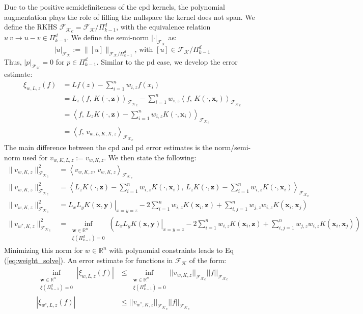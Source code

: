 \documentclass[11pt]{article}
\begin{document}
Due to the positive semidefiniteness of the cpd kernels, the polynomial augmentation plays the role of filling the nullspace the kernel does not span. We define the RKHS $\mathcal{F_K}_c = \mathcal{F_K} / \Pi_{k-1}^d$, with the equivalence relation $u ~ v \rightarrow u-v \in \Pi_{k-1}^d$. We define the semi-norm $| \cdot |_{\mathcal{F_K}}$ as:
\begin{equation}
	\left | u \right |_{\mathcal{F_K}} := \| [u] \|_{\mathcal{F_K} / \Pi_{k-1}^d} \text{, with } [u] \in \mathcal{F_K} / \Pi_{k-1}^d
\end{equation}
Thus, $| p |_{\mathcal{F_K}} = 0$ for $p \in \Pi_{k-1}^d$. Similar to the pd case, we develop the error estimate:
\begin{align*}
	\xi_{w,L,z}(f) &= Lf(z) - \sum_{i=1}^n w_{i,z} f(x_i)\\
	&= L_z \left \langle f, \, K(\cdot, \bm{z}) \right \rangle_{\mathcal{F_K}_c} - \sum_{i=1}^n w_{i,z} \left \langle f, \, K(\cdot, \bm{x}_i) \right \rangle_{\mathcal{F_K}_c}\\
	&= \left \langle f, \, L_z K(\cdot, \bm{z}) - \sum_{i=1}^n w_{i,z} K(\cdot, \bm{x}_i) \right \rangle_{\mathcal{F_K}_c}\\
	&= \left \langle f, \, v_{w,L,K,X,z} \right \rangle_{\mathcal{F_K}_c}
\end{align*}
The main difference between the cpd and pd error estimates is the norm/semi-norm used for $v_{w,K,L,z} := v_{w,K,z}$. We then state the following:
\begin{align*}
	\| v_{w,K,z} \|_{\mathcal{F_K}_c}^2 &= \left \langle v_{w,K,z}, \, v_{w,K,z} \right \rangle_{\mathcal{F_K}_c}\\
	\| v_{w,K,z} \|_{\mathcal{F_K}_c}^2 &= \left \langle L_z K(\cdot, \bm{z}) - \sum_{i=1}^n w_{i,z} K(\cdot, \bm{x}_i), \, L_z K(\cdot, \bm{z}) - \sum_{i=1}^n w_{i,z} K(\cdot, \bm{x}_i) \right \rangle_{\mathcal{F_K}_c}\\
	\| v_{w,K,z} \|_{\mathcal{F_K}_c}^2 &= \left. L_x L_y K(\bm{x}, \bm{y}) \right|_{x=y=z} - 2 \sum_{i=1}^n w_{i,z} K(\bm{x}_i, \bm{z}) + \sum_{i,j=1}^n w_{j,z} w_{i,z} K(\bm{x}_i, \bm{x}_j)\\
	\| v_{w^*,K,z} \|_{\mathcal{F_K}_c}^2 &= \inf_{\substack{\bm{w}\in \mathbb{R}^n \\ \xi (\Pi_{k-1}^d) = 0}} \left ( \left. L_x L_y K(\bm{x}, \bm{y}) \right|_{x=y=z} - 2 \sum_{i=1}^n w_{i,z} K(\bm{x}_i, \bm{z}) + \sum_{i,j=1}^n w_{j,z} w_{i,z} K(\bm{x}_i, \bm{x}_j) \right)
\end{align*}
Minimizing this norm for $w \in \mathbb{R}^n$ with polynomial constraints leads to Eq (\ref{eq:weight_solve}). An error estimate for functions in $\mathcal{F_K}$ of the form:
\begin{align*}
	\inf_{\substack{\bm{w}\in \mathbb{R}^n \\ \xi (\Pi_{k-1}^d) = 0}} |\xi_{w,L,z}(f)| &\le \inf_{\substack{\bm{w}\in \mathbb{R}^n \\ \xi (\Pi_{k-1}^d) = 0}} ||v_{w,K,z}||_{\mathcal{F_K}_c} ||f||_{\mathcal{F_K}_c}\\
	|\xi_{w^*,L,z}(f)| &\le ||v_{w^*,K,z}||_{\mathcal{F_K}_c} ||f||_{\mathcal{F_K}_c}\\
\end{align*}
\end{document}
